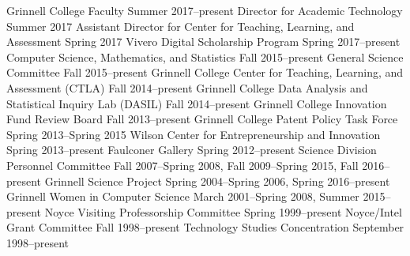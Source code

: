 
\begin{cventries}

  {Grinnell College Faculty}
  {Summer 2017--present}
  {Director for Academic Technology}
  {Summer 2017}
  {Assistant Director for Center for Teaching, Learning, and Assessment}
  {Spring 2017}
  {Vivero Digital Scholarship Program}
  {Spring 2017--present}
  {Computer Science, Mathematics, and Statistics}
  {Fall 2015--present}
  {General Science Committee}
  {Fall 2015--present}
  {Grinnell College Center for Teaching, Learning, and Assessment (CTLA)}
  {Fall 2014--present}
  {Grinnell College Data Analysis and Statistical Inquiry Lab (DASIL)}
  {Fall 2014--present}
  {Grinnell College Innovation Fund Review Board}
  {Fall 2013--present}
  {Grinnell College Patent Policy Task Force}
  {Spring 2013--Spring 2015}
  {Wilson Center for Entrepreneurship and Innovation}
  {Spring 2013--present}
  {Faulconer Gallery}
  {Spring 2012--present}
  {Science Division Personnel Committee}
  {
  Fall 2007--Spring 2008,
  Fall 2009--Spring 2015,
  Fall 2016--present
  }
  {Grinnell Science Project}
  {Spring 2004--Spring 2006,
   Spring 2016--present}
  {Grinnell Women in Computer Science}
  {March 2001--Spring 2008,
   Summer 2015--present}
  {Noyce Visiting Professorship Committee}
  {Spring 1999--present}
  {Noyce/Intel Grant Committee}
  {Fall 1998--present}
  {Technology Studies Concentration}
  {September 1998--present}

\end{cventries}

